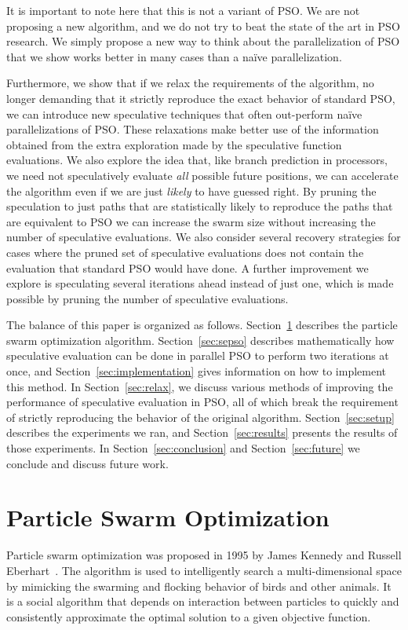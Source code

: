 \documentclass[smallcondensed]{svjour3}
\renewcommand{\sec}[1]{Section~\ref{sec:#1}}
\begin{document}
It is important to note here that this is not a variant of PSO.  We are not
proposing a new algorithm, and we do not try to beat the state of the art in
PSO research.  We simply propose a new way to think about the parallelization
of PSO that we show works better in many cases than a na\"ive parallelization.

Furthermore, we show that if we relax the requirements of the algorithm, no
longer demanding that it strictly reproduce the exact behavior of standard PSO,
we can introduce new speculative techniques that often out-perform na\"ive
parallelizations of PSO.  These relaxations make better use of the information
obtained from the extra exploration made by the speculative function
evaluations.  We also explore the idea that, like branch prediction in
processors, we need not speculatively evaluate \emph{all} possible future
positions, we can accelerate the algorithm even if we are just \emph{likely} to
have guessed right.  By pruning the speculation to just paths that are
statistically likely to reproduce the paths that are equivalent to PSO we can
increase the swarm size without increasing the number of speculative
evaluations.  We also consider several recovery strategies for cases where the
pruned set of speculative evaluations does not contain the evaluation that
standard PSO would have done.  A further improvement we explore is speculating
several iterations ahead instead of just one, which is made possible by pruning
the number of speculative evaluations.

The balance of this paper is organized as follows. \sec{pso} describes the
particle swarm optimization algorithm.  \sec{sepso} describes mathematically
how speculative evaluation can be done in parallel PSO to perform two
iterations at once, and \sec{implementation} gives information on how to
implement this method.  In \sec{relax}, we discuss various methods of improving
the performance of speculative evaluation in PSO, all of which break the
requirement of strictly reproducing the behavior of the original algorithm.
\sec{setup} describes the experiments we ran, and \sec{results} presents the
results of those experiments.  In \sec{conclusion} and \sec{future} we conclude
and discuss future work.

\section{Particle Swarm Optimization}
\label{sec:pso}

Particle swarm optimization was proposed in 1995 by James Kennedy and Russell
Eberhart~\citep{kennedy-1995-particle-swarm-optimization}.  The algorithm is
used to intelligently search a multi-dimensional space by mimicking the
swarming and flocking behavior of birds and other animals. It is a social
algorithm that depends on interaction between particles to quickly and
consistently approximate the optimal solution to a given objective function.
\end{document}
